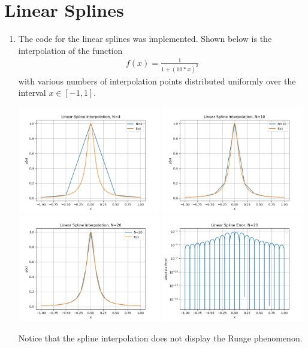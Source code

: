 \documentclass[10pt]{article}
\begin{document}
\section{Linear Splines}
\begin{enumerate}
  \item The code for the linear splines was implemented. Shown below is the interpolation of the function \begin{align*}
      f(x) = \frac{1}{1+(10*x)^2}
  \end{align*} with various numbers of interpolation points distributed uniformly over the interval \(x \in [-1, 1]\).

  \includegraphics[width=0.49\textwidth]{lin4.png}
  \includegraphics[width=0.49\textwidth]{lin10.png}
  \includegraphics[width=0.49\textwidth]{lin20.png}
  \includegraphics[width=0.49\textwidth]{lin_error20.png}

  Notice that the spline interpolation does not display the Runge phenomenon.

\end{enumerate}
\end{document}
